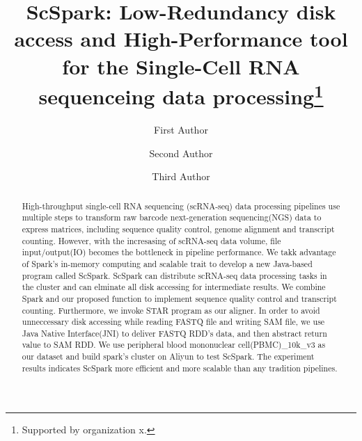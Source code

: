 \documentclass[runningheads]{llncs}
\begin{document}
%
\title{ScSpark: Low-Redundancy disk access and High-Performance tool for the Single-Cell RNA sequenceing data processing\thanks{Supported by organization x.}}
%
%
\author{First Author \and
Second Author \and
Third Author}
%
%
%
\maketitle
%
\begin{abstract}
High-throughput single-cell RNA sequencing
  (scRNA-seq) data processing pipelines use multiple steps to transform raw barcode next-generation sequencing(NGS) data to express matrices, including sequence quality control, genome alignment and transcript counting.
However, with the incresasing of scRNA-seq data volume, file input/output(IO) becomes the bottleneck in pipeline performance.
We takk advantage of Spark's in-memory computing and scalable trait to develop a new Java-based program called ScSpark.
ScSpark can distribute scRNA-seq data processing tasks in the cluster and can elminate all disk accessing for intermediate results.
We combine Spark and our proposed function to implement sequence quality control and transcript counting.
Furthermore, we invoke STAR program as our aligner.
In order to avoid unneccessary disk accessing while reading FASTQ file and writing SAM file, we use Java Native Interface(JNI) to deliver FASTQ RDD's data, and then abstract return value to SAM RDD.
We use peripheral blood mononuclear cell(PBMC)\_10k\_v3 as our dataset and build spark's cluster on Aliyun to test ScSpark.
The experiment results indicates ScSpark more efficient and more scalable than any tradition pipelines.
\end{abstract}
\end{document}
